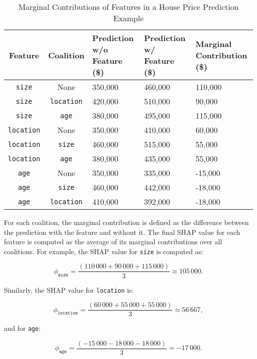 \documentclass[acmlarge]{acmart}
\begin{document}
\begin{table}[H]
    \caption{Marginal Contributions of Features in a House Price Prediction Example}
    \label{tab:shapley_calculation}
    \centering
    \begin{tabularx}{\textwidth}{|c|c|Y|Y|Y|}
        \hline
        \textbf{Feature} & \textbf{Coalition} & \textbf{Prediction w/o Feature (\$)} & \textbf{Prediction w/ Feature (\$)} & \textbf{Marginal Contribution (\$)} \\
        \hline
        \texttt{size}     & None             & 350,000 & 460,000 & 110,000 \\
        \texttt{size}     & \texttt{location} & 420,000 & 510,000 & 90,000  \\
        \texttt{size}     & \texttt{age}      & 380,000 & 495,000 & 115,000 \\
        \hline
        \texttt{location} & None             & 350,000 & 410,000 & 60,000  \\
        \texttt{location} & \texttt{size}    & 460,000 & 515,000 & 55,000  \\
        \texttt{location} & \texttt{age}     & 380,000 & 435,000 & 55,000  \\
        \hline
        \texttt{age}      & None             & 350,000 & 335,000 & -15,000 \\
        \texttt{age}      & \texttt{size}    & 460,000 & 442,000 & -18,000 \\
        \texttt{age}      & \texttt{location}& 410,000 & 392,000 & -18,000 \\
        \hline
    \end{tabularx}
\end{table}

For each coalition, the marginal contribution is defined as the difference between the prediction with the feature and without it. The final SHAP value for each feature is computed as the average of its marginal contributions over all coalitions. For example, the SHAP value for \texttt{size} is computed as:

\[
\phi_{\texttt{size}} = \frac{(110\,000 + 90\,000 + 115\,000)}{3} \approx 105\,000.
\]

Similarly, the SHAP value for \texttt{location} is:

\[
\phi_{\texttt{location}} = \frac{(60\,000 + 55\,000 + 55\,000)}{3} \approx 56\,667,
\]

and for \texttt{age}:

\[
\phi_{\texttt{age}} = \frac{(-15\,000 - 18\,000 - 18\,000)}{3} = -17\,000.
\]
\end{document}
